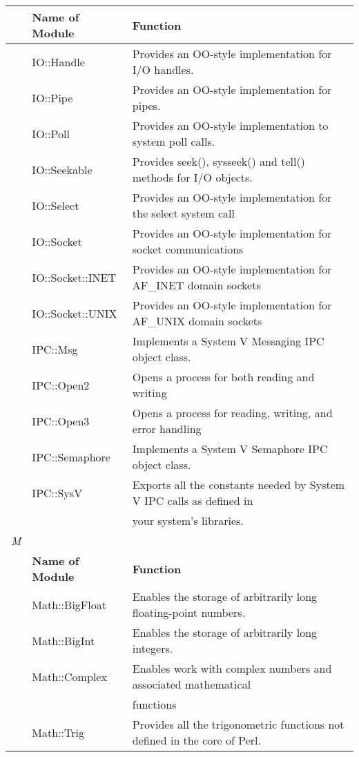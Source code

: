 \documentclass[a4paper,11pt]{book}
\begin{document}
\begin{tabular}{|p{0.2in}|p{1.0in}|p{2.9in}|} \hline 
 & \textbf{Name of Module} & \textbf{Function} \\ \hline 
 & IO::Handle & Provides an OO-style implementation for I/O handles. \\ \hline 
 & IO::Pipe & Provides an OO-style implementation for pipes. \\ \hline 
 & IO::Poll & Provides an OO-style implementation to system poll calls. \\ \hline 
 & IO::Seekable & Provides seek(), sysseek() and tell() methods for I/O objects. \\ \hline 
 & IO::Select & Provides an OO-style implementation for the select system call \\ \hline 
 & IO::Socket & Provides an OO-style implementation for socket communications \\ \hline 
 & IO::Socket::INET & Provides an OO-style implementation for AF\_INET domain sockets \\ \hline 
 & IO::Socket::UNIX & Provides an OO-style implementation for AF\_UNIX domain sockets \\ \hline 
 & IPC::Msg & Implements a System V Messaging IPC object class. \\ \hline 
 & IPC::Open2 & Opens a process for both reading and writing \\ \hline 
 & IPC::Open3 & Opens a process for reading, writing, and error handling \\ \hline 
 & IPC::Semaphore & Implements a System V Semaphore IPC object class. \\ \hline 
 & IPC::SysV & Exports all the constants needed by System V IPC calls as defined in \\ \hline 
 &  & your system's libraries. \\ \hline 
\newline \textit{M} &  &  \\ \hline 
 & \textbf{Name of Module} & \textbf{Function} \\ \hline 
 & Math::BigFloat & Enables the storage of arbitrarily long floating-point numbers. \\ \hline 
 & Math::BigInt & Enables the storage of arbitrarily long integers. \\ \hline 
 & Math::Complex & Enables work with complex numbers and associated mathematical \\ \hline 
 &  & functions \\ \hline 
 & Math::Trig & Provides all the trigonometric functions not defined in the core of Perl. \\ \hline 

\end{tabular}
\end{document}
